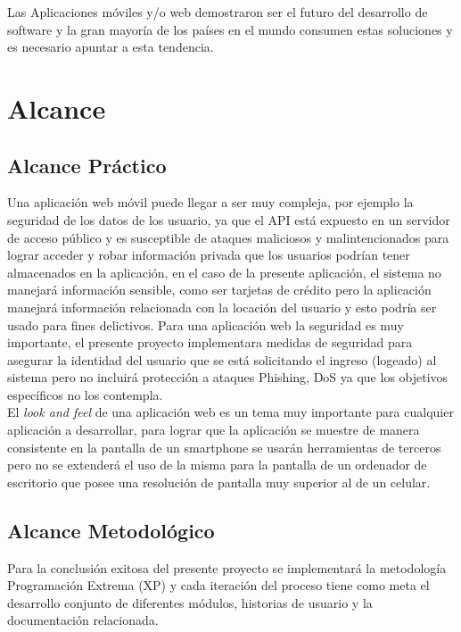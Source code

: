   Las Aplicaciones móviles y/o web demostraron ser el futuro del desarrollo de software y la gran mayoría de los países en el mundo consumen estas soluciones y es necesario apuntar a esta tendencia.\\



  \section{Alcance}
  \label{sec:Alcance}

    \subsection{Alcance Práctico}
    \label{sub:alcance_practico}
    Una aplicación web móvil puede llegar a ser muy compleja, por ejemplo la seguridad de los datos de los usuario, ya que el API está expuesto en un servidor de acceso público y es susceptible de ataques maliciosos y malintencionados para lograr acceder y robar información privada que los usuarios podrían tener almacenados en la aplicación, en el caso de la presente aplicación, el sistema no manejará información sensible, como ser tarjetas de crédito pero la aplicación manejará información relacionada con la locación del usuario y esto podría ser usado para fines delictivos. Para una aplicación web la seguridad es muy importante, el presente proyecto implementara medidas de seguridad para asegurar la identidad del usuario que se está solicitando el ingreso (logeado) al sistema pero no incluirá protección a ataques Phishing, DoS ya que los objetivos específicos no los contempla.\\


    El \emph{look and feel} de una aplicación web es un tema muy importante para cualquier aplicación a desarrollar, para lograr que la aplicación se muestre de manera consistente en la pantalla de un smartphone se usarán herramientas de terceros pero no se extenderá el uso de la misma para la pantalla de un ordenador de escritorio que posee una resolución de pantalla muy superior al de un celular.\\




    \subsection{Alcance Metodológico}
    \label{sub:alcance_metodologico}
    Para la conclusión exitosa del presente proyecto se implementará la metodología  Programación Extrema (XP) y cada iteración del proceso tiene como meta el desarrollo conjunto de diferentes módulos, historias de usuario y la documentación relacionada.

